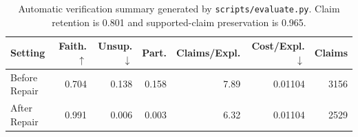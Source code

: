\begin{table}[!htbp]
\centering
\small
\begin{tabular}{lrrrrrr}
\toprule
Setting & Faith. $\uparrow$ & Unsup. $\downarrow$ & Part. & Claims/Expl. & Cost/Expl. $\downarrow$ & Claims \\
\midrule
Before Repair & 0.704 & 0.138 & 0.158 & 7.89 & 0.01104 & 3156 \\
After Repair & 0.991 & 0.006 & 0.003 & 6.32 & 0.01104 & 2529 \\
\bottomrule
\end{tabular}
\caption{Automatic verification summary generated by \texttt{scripts/evaluate.py}. Claim retention is 0.801 and supported-claim preservation is 0.965.}
\label{tab:auto-summary}
\end{table}

